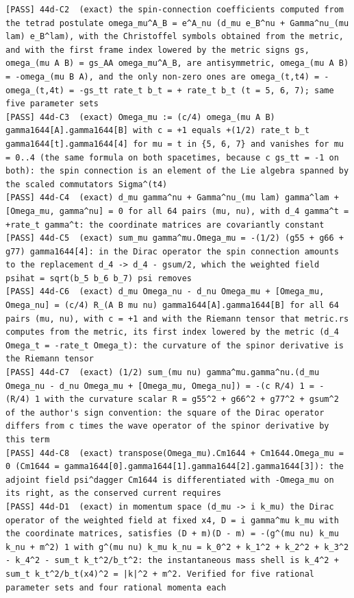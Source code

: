 \documentclass[
  10pt,
]{article}
\begin{document}
\begin{verbatim}
[PASS] 44d-C2  (exact) the spin-connection coefficients computed from the tetrad postulate omega_mu^A_B = e^A_nu (d_mu e_B^nu + Gamma^nu_(mu lam) e_B^lam), with the Christoffel symbols obtained from the metric, and with the first frame index lowered by the metric signs gs, omega_(mu A B) = gs_AA omega_mu^A_B, are antisymmetric, omega_(mu A B) = -omega_(mu B A), and the only non-zero ones are omega_(t,t4) = -omega_(t,4t) = -gs_tt rate_t b_t = + rate_t b_t (t = 5, 6, 7); same five parameter sets
[PASS] 44d-C3  (exact) Omega_mu := (c/4) omega_(mu A B) gamma1644[A].gamma1644[B] with c = +1 equals +(1/2) rate_t b_t gamma1644[t].gamma1644[4] for mu = t in {5, 6, 7} and vanishes for mu = 0..4 (the same formula on both spacetimes, because c gs_tt = -1 on both): the spin connection is an element of the Lie algebra spanned by the scaled commutators Sigma^(t4)
[PASS] 44d-C4  (exact) d_mu gamma^nu + Gamma^nu_(mu lam) gamma^lam + [Omega_mu, gamma^nu] = 0 for all 64 pairs (mu, nu), with d_4 gamma^t = +rate_t gamma^t: the coordinate matrices are covariantly constant
[PASS] 44d-C5  (exact) sum_mu gamma^mu.Omega_mu = -(1/2) (g55 + g66 + g77) gamma1644[4]: in the Dirac operator the spin connection amounts to the replacement d_4 -> d_4 - gsum/2, which the weighted field psihat = sqrt(b_5 b_6 b_7) psi removes
[PASS] 44d-C6  (exact) d_mu Omega_nu - d_nu Omega_mu + [Omega_mu, Omega_nu] = (c/4) R_(A B mu nu) gamma1644[A].gamma1644[B] for all 64 pairs (mu, nu), with c = +1 and with the Riemann tensor that metric.rs computes from the metric, its first index lowered by the metric (d_4 Omega_t = -rate_t Omega_t): the curvature of the spinor derivative is the Riemann tensor
[PASS] 44d-C7  (exact) (1/2) sum_(mu nu) gamma^mu.gamma^nu.(d_mu Omega_nu - d_nu Omega_mu + [Omega_mu, Omega_nu]) = -(c R/4) 1 = - (R/4) 1 with the curvature scalar R = g55^2 + g66^2 + g77^2 + gsum^2 of the author's sign convention: the square of the Dirac operator differs from c times the wave operator of the spinor derivative by this term
[PASS] 44d-C8  (exact) transpose(Omega_mu).Cm1644 + Cm1644.Omega_mu = 0 (Cm1644 = gamma1644[0].gamma1644[1].gamma1644[2].gamma1644[3]): the adjoint field psi^dagger Cm1644 is differentiated with -Omega_mu on its right, as the conserved current requires
[PASS] 44d-D1  (exact) in momentum space (d_mu -> i k_mu) the Dirac operator of the weighted field at fixed x4, D = i gamma^mu k_mu with the coordinate matrices, satisfies (D + m)(D - m) = -(g^(mu nu) k_mu k_nu + m^2) 1 with g^(mu nu) k_mu k_nu = k_0^2 + k_1^2 + k_2^2 + k_3^2 - k_4^2 - sum_t k_t^2/b_t^2: the instantaneous mass shell is k_4^2 + sum_t k_t^2/b_t(x4)^2 = |k|^2 + m^2. Verified for five rational parameter sets and four rational momenta each

\end{verbatim}
\end{document}
